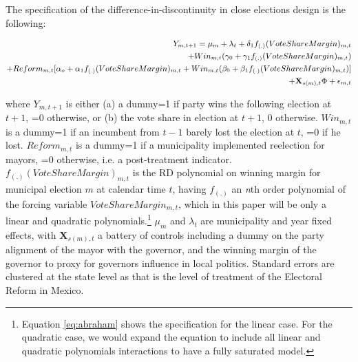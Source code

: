 The specification of the difference-in-discontinuity in close elections design is the following:

\begin{equation}
\small
\label{eq:abraham}
\begin{split}
Y_{m,t+1}=\mu_m + \lambda_t + \delta_1 f_{(.)}(VoteShareMargin)_{m,t} \\  
+ Win_{m,t}(\gamma_0 + \gamma_1 f_{(.)}(VoteShareMargin)_{m,t}) \\ + Reform_{m,t}[\alpha_o + \alpha_1f_{(.)}(VoteShareMargin)_{m,t} 
+ Win_{m,t}(\beta_0 + \beta_1 f_{(.)}(VoteShareMargin)_{m,t} )] \\ + \mathbf{X}_{s(m),t} \Phi + \epsilon_{m,t}
\end{split}
\end{equation}   

where $Y_{m,t+1}$ is either (a) a dummy=1 if party wins the following election at $t+1$, =0 otherwise, or (b) the vote share in election at $t+1$, 0 otherwise. $Win_{m,t}$ is a dummy=1 if an incumbent from $t-1$ barely lost the election at $t$, =0 if he lost. $Reform_{m,t}$ is a dummy=1 if a municipality implemented reelection for mayors, =0 otherwise, i.e. a post-treatment indicator. $f_{(.)}(VoteShareMargin)_{m,t}$ is the RD polynomial on winning margin for municipal election $m$ at calendar time $t$, having $f_{(.)}$ an \emph{n}th order polynomial of the forcing variable $VoteShareMargin_{m,t}$, which in this paper will be only a linear and quadratic polynomials.\footnote{Equation \ref{eq:abraham} shows the specification for the linear case. For the quadratic case, we would expand the equation to include all linear and quadratic polynomials interactions to have a fully saturated model.} $\mu_m$ and $\lambda_t$ are municipality and year fixed effects, with $\mathbf{X}_{s(m),t}$ a battery of controls including a dummy on the party alignment of the mayor with the governor, and the winning margin of the governor to proxy for governors influence in local politics. Standard errors are clustered at the state level as that is the level of treatment of the Electoral Reform in Mexico. 

